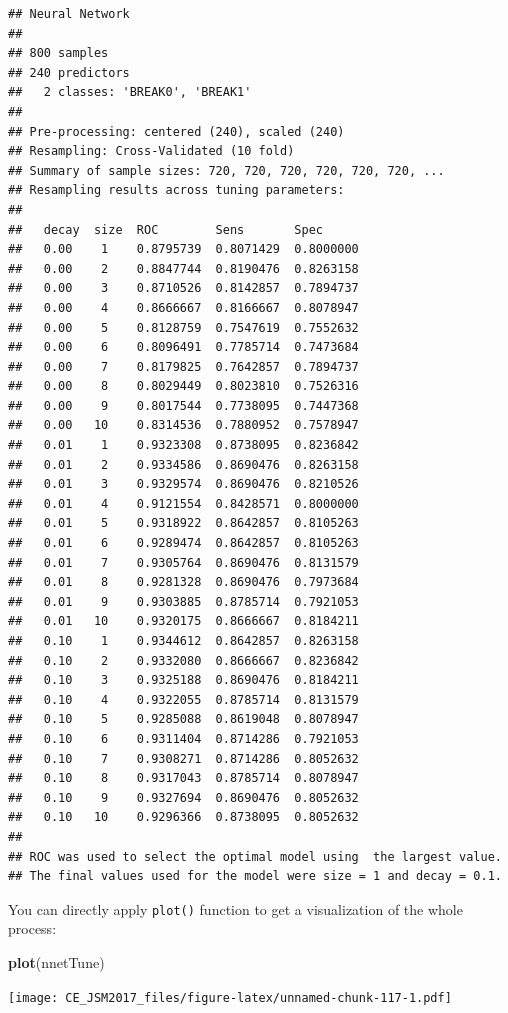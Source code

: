 \documentclass[]{book}
\newenvironment{Shaded}{\begin{snugshade}}{\end{snugshade}}
\newcommand{\KeywordTok}[1]{\textcolor[rgb]{0.13,0.29,0.53}{\textbf{{#1}}}}
\newcommand{\NormalTok}[1]{{#1}}
\theoremstyle{definition}
\theoremstyle{definition}
\theoremstyle{remark}
\begin{document}
\begin{verbatim}
## Neural Network 
## 
## 800 samples
## 240 predictors
##   2 classes: 'BREAK0', 'BREAK1' 
## 
## Pre-processing: centered (240), scaled (240) 
## Resampling: Cross-Validated (10 fold) 
## Summary of sample sizes: 720, 720, 720, 720, 720, 720, ... 
## Resampling results across tuning parameters:
## 
##   decay  size  ROC        Sens       Spec     
##   0.00    1    0.8795739  0.8071429  0.8000000
##   0.00    2    0.8847744  0.8190476  0.8263158
##   0.00    3    0.8710526  0.8142857  0.7894737
##   0.00    4    0.8666667  0.8166667  0.8078947
##   0.00    5    0.8128759  0.7547619  0.7552632
##   0.00    6    0.8096491  0.7785714  0.7473684
##   0.00    7    0.8179825  0.7642857  0.7894737
##   0.00    8    0.8029449  0.8023810  0.7526316
##   0.00    9    0.8017544  0.7738095  0.7447368
##   0.00   10    0.8314536  0.7880952  0.7578947
##   0.01    1    0.9323308  0.8738095  0.8236842
##   0.01    2    0.9334586  0.8690476  0.8263158
##   0.01    3    0.9329574  0.8690476  0.8210526
##   0.01    4    0.9121554  0.8428571  0.8000000
##   0.01    5    0.9318922  0.8642857  0.8105263
##   0.01    6    0.9289474  0.8642857  0.8105263
##   0.01    7    0.9305764  0.8690476  0.8131579
##   0.01    8    0.9281328  0.8690476  0.7973684
##   0.01    9    0.9303885  0.8785714  0.7921053
##   0.01   10    0.9320175  0.8666667  0.8184211
##   0.10    1    0.9344612  0.8642857  0.8263158
##   0.10    2    0.9332080  0.8666667  0.8236842
##   0.10    3    0.9325188  0.8690476  0.8184211
##   0.10    4    0.9322055  0.8785714  0.8131579
##   0.10    5    0.9285088  0.8619048  0.8078947
##   0.10    6    0.9311404  0.8714286  0.7921053
##   0.10    7    0.9308271  0.8714286  0.8052632
##   0.10    8    0.9317043  0.8785714  0.8078947
##   0.10    9    0.9327694  0.8690476  0.8052632
##   0.10   10    0.9296366  0.8738095  0.8052632
## 
## ROC was used to select the optimal model using  the largest value.
## The final values used for the model were size = 1 and decay = 0.1.
\end{verbatim}

You can directly apply \texttt{plot()} function to get a visualization
of the whole process:

\begin{Shaded}
\begin{Highlighting}[]
\KeywordTok{plot}\NormalTok{(nnetTune)}
\end{Highlighting}
\end{Shaded}

\texttt{[image: CE\_JSM2017\_files/figure-latex/unnamed-chunk-117-1.pdf]}
\end{document}

